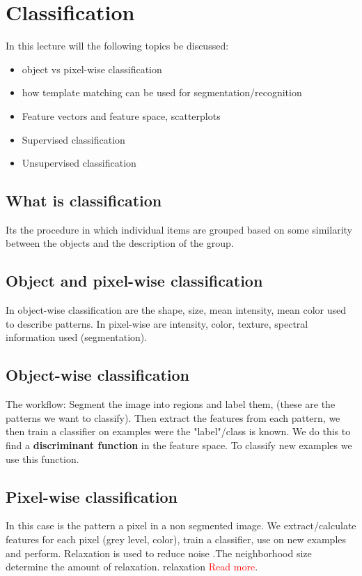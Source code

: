 
\section{Classification}
In this lecture will the following topics be discussed: 
\begin{itemize}
	\item object vs pixel-wise classification 
	\item how template matching can be used for segmentation/recognition
	\item Feature vectors and feature space, scatterplots
	\item Supervised classification
	\item Unsupervised classification
\end{itemize}

\subsection*{What is classification}
Its the procedure in which individual items are grouped based on some similarity between the objects and the description of the group. 



\subsection*{Object and pixel-wise classification}
In object-wise classification are the shape, size, mean intensity, mean color used to describe patterns. In pixel-wise are intensity, color, texture, spectral information used (segmentation).



\subsection*{Object-wise classification}
The workflow: Segment the image into regions and label them, (these are the patterns we want to classify). Then extract the features from each pattern, we then train a classifier on examples were the "label"/class is known. We do this to find a \textbf{discriminant function} in the feature space. To classify new examples we use this function. 



\subsection*{Pixel-wise classification}
In this case is the pattern a pixel in a non segmented image. We extract/calculate features for each pixel (grey level, color), train a classifier, use on new examples and perform. Relaxation is used to reduce noise .The neighborhood size determine the amount of relaxation. relaxation \textcolor{red}{Read more}.




